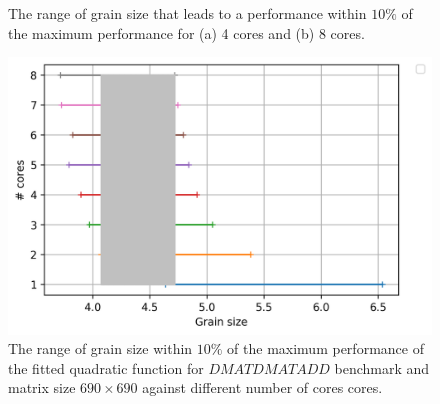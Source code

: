 \vspace{\baselineskip}	
\begin{figure}[H]
	\centering
	\caption{The range of grain size that leads to a performance within $10\%$ of the maximum performance for (a) 4 cores and (b) 8 cores.}	
	\label{fig12}
\end{figure}


\begin{figure}[H]
	\centering
	\includegraphics[scale=.75]{images/polyfit/fig_690_peak_range_silver.png}
	\caption{The range of grain size within $10\%$ of the maximum performance of the fitted quadratic function for $DMATDMATADD$ benchmark and matrix size $690\times690$ against different number of cores cores.}	
	\label{fig13}
\end{figure}




